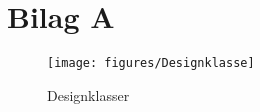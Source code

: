 \section{Bilag A} \label{sec:bilagA}


\begin{figure} [H]
\centering
\texttt{[image: figures/Designklasse]}
\caption{Designklasser}
\label{fig:Designklasser}
\end{figure}